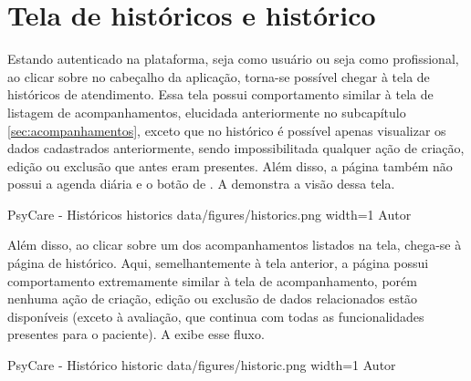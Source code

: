 \section{Tela de históricos e histórico}
\label{sec:historicos}

Estando autenticado na plataforma, seja como usuário ou seja como profissional, ao clicar sobre  no cabeçalho da aplicação, torna-se possível chegar à tela de históricos de atendimento. Essa tela possui comportamento similar à tela de listagem de acompanhamentos, elucidada anteriormente no subcapítulo \ref{sec:acompanhamentos}, exceto que no histórico é possível apenas visualizar os dados cadastrados anteriormente, sendo impossibilitada qualquer ação de criação, edição ou exclusão que antes eram presentes. Além disso, a página também não possui a agenda diária e o botão de . A  demonstra a visão dessa tela.

\image
    {PsyCare - Históricos}
    {historics}
    {data/figures/historics.png}
    {width=1\textwidth}
    {Autor}

Além disso, ao clicar sobre um dos acompanhamentos listados na tela, chega-se à página de histórico. Aqui, semelhantemente à tela anterior, a página possui comportamento extremamente similar à tela de acompanhamento, porém nenhuma ação de criação, edição ou exclusão de dados relacionados estão disponíveis (exceto à avaliação, que continua com todas as funcionalidades presentes para o paciente). A  exibe esse fluxo.

\image
    {PsyCare - Histórico}
    {historic}
    {data/figures/historic.png}
    {width=1\textwidth}
    {Autor}